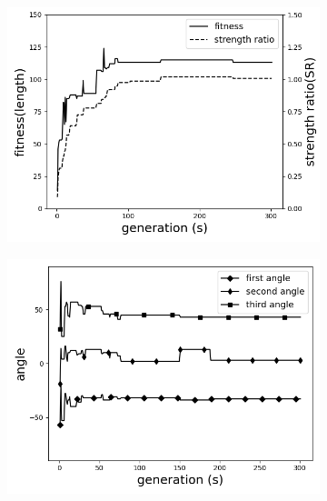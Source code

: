 \documentclass{article}
\begin{document}
\begin{figure}[!t]
	\centering
		\begin{subfigure}[b]{0.8\linewidth}
			\includegraphics[width=\linewidth]{2020-11-10-pre-image/Three_distinct_angles_fitness_and_sr.png}
		\end{subfigure}

		\begin{subfigure}[b]{0.8\linewidth}
			\includegraphics[width=\linewidth]{2020-11-10-pre-image/three_distinct_angles_angle_change.png}
		\end{subfigure}


\end{figure}
\end{document}
